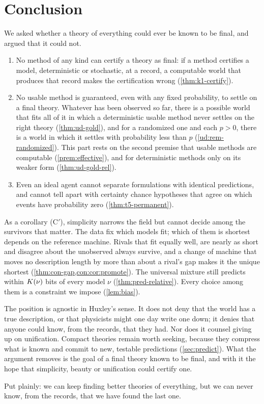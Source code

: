 \section{Conclusion}\label{sec:conclusion}

We asked whether a theory of everything could ever be known to be final, and argued that
it could not.
\begin{enumerate}[label=(C\arabic*)]
  \item No method of any kind can certify a theory as final: if a method certifies a
        model, deterministic or stochastic, at a record, a computable world that produces
        that record makes the certification wrong (\cref{thm:k1-certify}).
  \item No usable method is guaranteed, even with any fixed probability, to settle on a
        final theory. Whatever has been observed so far, there is a possible world that
        fits all of it in which a deterministic usable method never settles on the right
        theory (\cref{thm:ud-gold}), and for a randomized one and each $p>0$, there is a world in which it settles with
        probability less than $p$ (\cref{ud:rem-randomized}). This part rests on the second premise that usable methods
        are computable (\cref{prem:effective}), and for deterministic methods only on its
        weaker form (\cref{thm:ud-gold-rel}).
  \item Even an ideal agent cannot separate formulations with identical predictions,
        and cannot tell apart with certainty chance hypotheses that agree on which events
        have probability zero (\cref{thm:t5-permanent}).
\end{enumerate}
As a corollary (C$'$), simplicity narrows the field but cannot decide among the survivors
that matter. The data fix which models fit; which of them is shortest depends on the
reference machine. Rivals that fit equally well, are nearly as short and disagree about
the unobserved always survive, and a change of machine that moves no description length by more than about a rival's gap makes it the
unique shortest (\cref{thm:con-gap,con:cor:promote}). The universal mixture still predicts
within $K(\nu)$ bits of every model $\nu$ (\cref{thm:pred-relative}). Every choice among them is a
constraint we impose (\cref{lem:bias}).

The position is agnostic in Huxley's sense. It does not deny that the world has a true
description, or that physicists might one day write one down; it denies that anyone
could know, from the records, that they had. Nor does it counsel giving up on unification. Compact theories remain
worth seeking, because they compress what is known and commit to new, testable
predictions (\cref{sec:predict}). What the argument removes is the goal of a final theory known to be final, and with it the hope that simplicity, beauty
or unification could certify one.

Put plainly: we can keep finding better theories of everything, but we can never know,
from the records, that we have found the last one.
